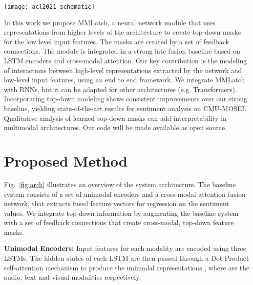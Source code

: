 \documentclass{article}
\begin{document}
\begin{figure*}[h]
\centering
\texttt{[image: acl2021\_schematic]}
\caption{Architecture overview of three high-level modules, composing the overall system: Unimodal encoders, Cross-modal fusion and MMLatch. Solid lines indicate the feedforward connections (bottom-up processing), while dashed lines indicate feedback connections (top-down processing). Colors indicate different modalities (Blue: Audio, Orange: Text, Yellow: Visual)}
\label{fig:arch}
\end{figure*}

In this work we propose MMLatch, a neural network module that uses representations from higher levels of the architecture to create top-down masks for the low level input features. The masks are created by a set of feedback connections. The module is integrated in a strong late fusion baseline based on LSTM \cite{hochreiter1997long} encoders and cross-modal attention.
Our key contribution is the modeling of interactions between high-level representations extracted by the network and low-level input features, using an end to end framework.
We integrate MMLatch with RNNs, but it can be adapted for other architectures (e.g. Transformers).
Incorporating top-down modeling shows consistent improvements over our strong baseline, yielding state-of-the-art results for sentiment analysis on CMU-MOSEI.
Qualitative analysis of learned top-down masks can add interpretability in multimodal architectures.
Our code will be made available as open source.


\section{Proposed Method}
\label{sec:proposed}


Fig.~\ref{fig:arch} illustrates an overview of the system architecture.
The baseline system consists of a set of unimodal encoders and a cross-modal attention fusion network, that extracts fused feature vectors for regression on the sentiment values. 
We integrate top-down information by augmenting the baseline system with a set of feedback connections that create cross-modal, top-down feature masks. 


\noindent\textbf{Unimodal Encoders:} 
Input features  for each modality are encoded using three LSTMs. 
The hidden states of each LSTM are then passed through a Dot Product self-attention mechanism 
to produce the unimodal representations ,  where  are the audio, text and visual modalities respectively.
\end{document}
